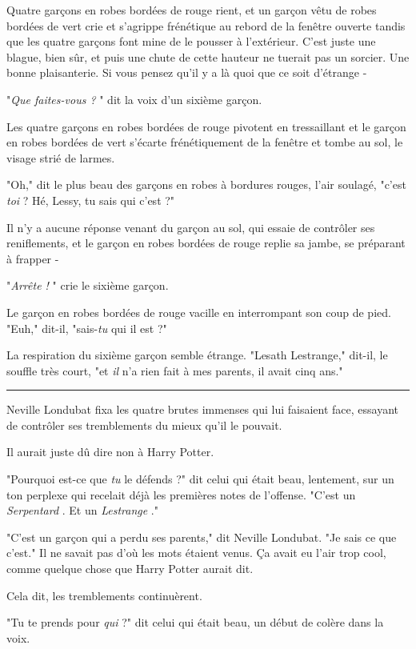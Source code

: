 Quatre garçons en robes bordées de rouge rient, et un garçon vêtu de robes bordées de vert crie et s'agrippe frénétique au rebord de la fenêtre ouverte tandis que les quatre garçons font mine de le pousser à l'extérieur. C'est juste une blague, bien sûr, et puis une chute de cette hauteur ne tuerait pas un sorcier. Une bonne plaisanterie. Si vous pensez qu'il y a là quoi que ce soit d'étrange -

"\emph{Que faites-vous ?} " dit la voix d'un sixième garçon.

Les quatre garçons en robes bordées de rouge pivotent en tressaillant et le garçon en robes bordées de vert s'écarte frénétiquement de la fenêtre et tombe au sol, le visage strié de larmes.

"Oh," dit le plus beau des garçons en robes à bordures rouges, l'air soulagé, "c'est \emph{toi } ? Hé, Lessy, tu sais qui c'est ?"

Il n'y a aucune réponse venant du garçon au sol, qui essaie de contrôler ses reniflements, et le garçon en robes bordées de rouge replie sa jambe, se préparant à frapper -

"\emph{Arrête !} " crie le sixième garçon.

Le garçon en robes bordées de rouge vacille en interrompant son coup de pied. "Euh," dit-il, "sais-\emph{tu}  qui il est ?"

La respiration du sixième garçon semble étrange. "Lesath Lestrange," dit-il, le souffle très court, "et \emph{il}  n'a rien fait à mes parents, il avait cinq ans."
\par\noindent\rule{\textwidth}{0.4pt}
Neville Londubat fixa les quatre brutes immenses qui lui faisaient face, essayant de contrôler ses tremblements du mieux qu'il le pouvait.

Il aurait juste dû dire non à Harry Potter.

"Pourquoi est-ce que \emph{tu}  le défends ?" dit celui qui était beau, lentement, sur un ton perplexe qui recelait déjà les premières notes de l'offense. "C'est un \emph{Serpentard} . Et un \emph{Lestrange} ."

"C'est un garçon qui a perdu ses parents," dit Neville Londubat. "Je sais ce que c'est." Il ne savait pas d'où les mots étaient venus. Ça avait eu l'air trop cool, comme quelque chose que Harry Potter aurait dit.

Cela dit, les tremblements continuèrent.

"Tu te prends pour \emph{qui}  ?" dit celui qui était beau, un début de colère dans la voix.

